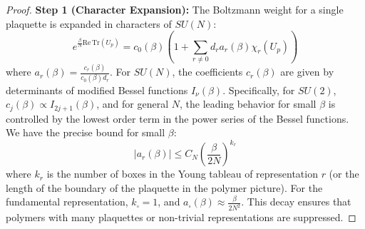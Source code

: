 \begin{proof}
\textbf{Step 1 (Character Expansion):}
The Boltzmann weight for a single plaquette is expanded in characters of $SU(N)$:
\begin{equation}
e^{\frac{\beta}{N}\mathrm{Re}\,\mathrm{Tr}(U_p)} = c_0(\beta) \left( 1 + \sum_{r \neq 0} d_r a_r(\beta) \chi_r(U_p) \right)
\end{equation}
where $a_r(\beta) = \frac{c_r(\beta)}{c_0(\beta) d_r}$.
For $SU(N)$, the coefficients $c_r(\beta)$ are given by determinants of modified Bessel functions $I_\nu(\beta)$. Specifically, for $SU(2)$, $c_j(\beta) \propto I_{2j+1}(\beta)$, and for general $N$, the leading behavior for small $\beta$ is controlled by the lowest order term in the power series of the Bessel functions.
We have the precise bound for small $\beta$:
\begin{equation}
|a_r(\beta)| \leq C_N \left(\frac{\beta}{2N}\right)^{k_r}
\end{equation}
where $k_r$ is the number of boxes in the Young tableau of representation $r$ (or the length of the boundary of the plaquette in the polymer picture). For the fundamental representation, $k_\square = 1$, and $a_\square(\beta) \approx \frac{\beta}{2N^2}$.
This decay ensures that polymers with many plaquettes or non-trivial representations are suppressed.


\end{proof}

